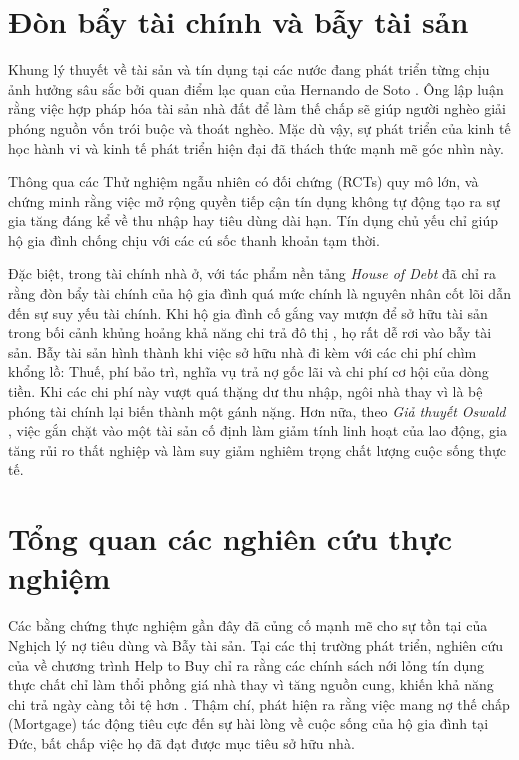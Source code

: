 \documentclass[12pt,a4paper]{report}
\begin{document}
\section{Đòn bẩy tài chính và bẫy tài sản}

Khung lý thuyết về tài sản và tín dụng tại các nước đang phát triển từng chịu ảnh hưởng sâu sắc bởi quan điểm lạc quan của Hernando de Soto \parencite{deSoto2000}. Ông lập luận rằng việc hợp pháp hóa tài sản nhà đất để làm thế chấp sẽ giúp người nghèo giải phóng nguồn vốn trói buộc và thoát nghèo. Mặc dù vậy, sự phát triển của kinh tế học hành vi và kinh tế phát triển hiện đại đã thách thức mạnh mẽ góc nhìn này.

Thông qua các Thử nghiệm ngẫu nhiên có đối chứng (RCTs) quy mô lớn, \textcite{Banerjee2015} và \textcite{Karlan2010} chứng minh rằng việc mở rộng quyền tiếp cận tín dụng không tự động tạo ra sự gia tăng đáng kể về thu nhập hay tiêu dùng dài hạn. Tín dụng chủ yếu chỉ giúp hộ gia đình chống chịu với các cú sốc thanh khoản tạm thời.

Đặc biệt, trong tài chính nhà ở, \textcite{Mian2014} với tác phẩm nền tảng \textit{House of Debt} đã chỉ ra rằng đòn bẩy tài chính của hộ gia đình quá mức chính là nguyên nhân cốt lõi dẫn đến sự suy yếu tài chính. Khi hộ gia đình cố gắng vay mượn để sở hữu tài sản trong bối cảnh khủng hoảng khả năng chi trả đô thị \textcite{Glaeser2018}, họ rất dễ rơi vào bẫy tài sản. Bẫy tài sản hình thành khi việc sở hữu nhà đi kèm với các chi phí chìm khổng lồ: Thuế, phí bảo trì, nghĩa vụ trả nợ gốc lãi và chi phí cơ hội của dòng tiền. Khi các chi phí này vượt quá thặng dư thu nhập, ngôi nhà thay vì là bệ phóng tài chính lại biến thành một gánh nặng. Hơn nữa, theo \textit{Giả thuyết Oswald} \parencite{Oswald1996}, việc gắn chặt vào một tài sản cố định làm giảm tính linh hoạt của lao động, gia tăng rủi ro thất nghiệp và làm suy giảm nghiêm trọng chất lượng cuộc sống thực tế.

\section{Tổng quan các nghiên cứu thực nghiệm}

Các bằng chứng thực nghiệm gần đây đã củng cố mạnh mẽ cho sự tồn tại của Nghịch lý nợ tiêu dùng và Bẫy tài sản. Tại các thị trường phát triển, nghiên cứu của \textcite{Carozzi2024} về chương trình Help to Buy chỉ ra rằng các chính sách nới lỏng tín dụng thực chất chỉ làm thổi phồng giá nhà thay vì tăng nguồn cung, khiến khả năng chi trả ngày càng tồi tệ hơn \parencite{LarsonMartinez2025, Brown2015}. Thậm chí, \textcite{WillRenz2023} phát hiện ra rằng việc mang nợ thế chấp (Mortgage) tác động tiêu cực đến sự hài lòng về cuộc sống của hộ gia đình tại Đức, bất chấp việc họ đã đạt được mục tiêu sở hữu nhà.
\end{document}
